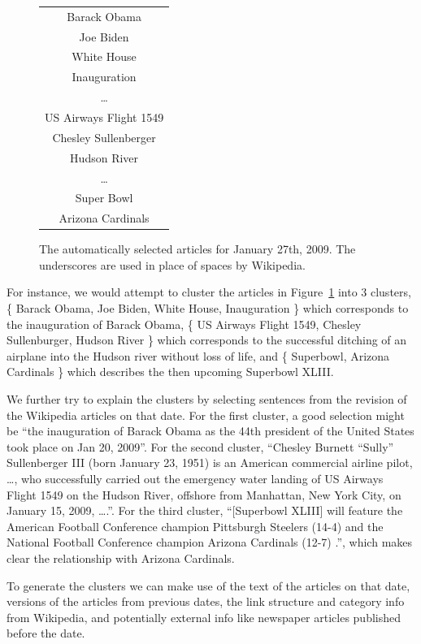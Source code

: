 \documentclass[11pt]{article}
\newcommand{\war}[1]{{\sf\small #1}}
\begin{document}
\begin{figure}
\centering
\begin{tabular}{|c|}
\hline
\war{Barack Obama} \\
\war{Joe Biden} \\
\war{White House} \\
\war{Inauguration} \\
\dots \\
\war{US Airways Flight 1549} \\
\war{Chesley Sullenberger} \\
\war{Hudson River} \\
\dots \\
\war{Super Bowl} \\
\war{Arizona Cardinals} \\
\hline
\end{tabular}
\caption{The automatically selected articles for January 27th, 2009. The underscores are used in place of spaces by Wikipedia.}
\label{fig:topics-jan-27}
\end{figure}

For instance, we would attempt to cluster the articles in Figure~\ref{fig:topics-jan-27} into 3 clusters, \{ \war{Barack Obama}, \war{Joe Biden}, \war{White House}, \war{Inauguration} \} which corresponds to the inauguration of Barack Obama, \{ \war{US Airways Flight 1549}, \war{Chesley Sullenburger}, \war{Hudson River} \} which corresponds to the successful ditching of an airplane into the Hudson river without loss of life, and \{ \war{Superbowl}, \war{Arizona Cardinals} \} which describes the then upcoming Superbowl XLIII.

We further try to explain the clusters by selecting sentences from the revision of the Wikipedia articles on that date. For the first cluster, a good selection might be ``the inauguration of Barack Obama as the 44th president of the United States took place on Jan 20, 2009''. For the second cluster, ``Chesley Burnett ``Sully'' Sullenberger III (born January 23, 1951)  is an American commercial airline pilot, \ldots, who successfully carried out the emergency water landing of US Airways Flight 1549 on the Hudson River, offshore from Manhattan, New York City, on January 15, 2009, \ldots.''. For the third cluster, ``[Superbowl XLIII] will feature the American Football Conference champion Pittsburgh Steelers (14-4) and the National Football Conference champion Arizona Cardinals (12-7) .'', which makes clear the relationship with \war{Arizona Cardinals}.

To generate the clusters we can make use of the text of the articles on that date, versions of the articles from previous dates, the link structure and category info from Wikipedia, and potentially external info like newspaper articles published before the date.
\end{document}
